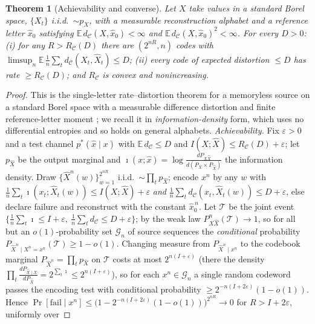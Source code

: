 \documentclass[11pt]{article}
\newtheorem{theorem}{Theorem}
\theoremstyle{definition}
\theoremstyle{remark}
\newcommand{\E}{\mathbb{E}}
\begin{document}
\begin{theorem}[Achievability and converse]\label{thm:coding}
Let $X$ take values in a standard Borel space, $\{X_t\}$ i.i.d.\ $\sim p_X$, with a
measurable reconstruction alphabet and a reference letter $\hat x_0$ satisfying
$\E\,d_{\mathcal{C}}(X,\hat x_0)<\infty$ and $\E\,d_{\mathcal{C}}(X,\hat x_0)^2<\infty$.
For every $D>0$: \emph{(i)} for any $R>R_{\mathcal{C}}(D)$ there are $(2^{nR},n)$ codes
with $\limsup_n\E\,\tfrac1n\sum_t d_{\mathcal{C}}(X_t,\hat X_t)\le D$; \emph{(ii)}
every code of expected distortion $\le D$ has rate $\ge R_{\mathcal{C}}(D)$; and
$R_{\mathcal{C}}$ is convex and nonincreasing.
\end{theorem}
\begin{proof}
This is the single-letter rate--distortion theorem for a memoryless source on a
standard Borel space with a measurable difference distortion and finite
reference-letter moment \cite{berger1971}; we recall it in \emph{information-density}
form, which uses no differential entropies and so holds on general alphabets.
\emph{Achievability.} Fix $\varepsilon>0$ and a test channel $p^{*}(\hat x\mid x)$
with $\E\,d_{\mathcal{C}}\le D$ and $I(X;\hat X)\le R_{\mathcal{C}}(D)+\varepsilon$;
let $p_{\hat X}$ be the output marginal and $\imath(x;\hat x)=\log\frac{dP_{X\hat X}}%
{d(P_X\!\times\!P_{\hat X})}$ the information density. Draw
$\{\hat X^n(w)\}_{w=1}^{2^{nR}}$ i.i.d.\ $\sim\prod_t p_{\hat X}$; encode $x^n$ by any
$w$ with $\tfrac1n\sum_t\imath(x_t;\hat X_t(w))\le I(X;\hat X)+\varepsilon$
\emph{and} $\tfrac1n\sum_t d_{\mathcal{C}}(x_t,\hat X_t(w))\le D+\varepsilon$, else
declare failure and reconstruct with the constant $\hat x_0^{\,n}$. Let $\mathcal{T}$
be the joint event $\{\tfrac1n\sum_t\imath\le I+\varepsilon,\ \tfrac1n\sum_t
d_{\mathcal{C}}\le D+\varepsilon\}$; by the weak law $P_{X\hat X}^{n}(\mathcal{T})\to1$,
so for all but an $o(1)$-probability set $\mathcal{G}_n$ of source sequences the
\emph{conditional} probability $P_{\hat X^n\mid X^n=x^n}(\mathcal{T})\ge1-o(1)$.
Changing measure from $P_{\hat X^n\mid x^n}$ to the codebook marginal
$P_{\hat X^n}=\prod_t p_{\hat X}$ on $\mathcal{T}$ costs at most $2^{n(I+\varepsilon)}$
(there the density $\prod_t\frac{dP_{\hat X\mid X}}{dP_{\hat X}}=2^{\sum_t\imath}\le
2^{n(I+\varepsilon)}$), so for each $x^n\in\mathcal{G}_n$ a single random codeword
passes the encoding test with conditional probability $\ge2^{-n(I+2\varepsilon)}
(1-o(1))$. Hence $\Pr[\mathrm{fail}\mid x^n]\le\big(1-2^{-n(I+2\varepsilon)}
(1-o(1))\big)^{2^{nR}}\to0$ for $R>I+2\varepsilon$, uniformly over

\end{proof}
\end{document}
